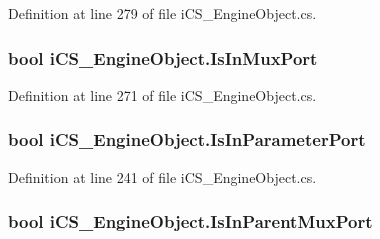 Definition at line 279 of file i\+C\+S\+\_\+\+Engine\+Object.\+cs.

\hypertarget{classi_c_s___engine_object_a36a536c2bf8972d1c82a1d183d91dc63}{
\subsubsection[{Is\+In\+Mux\+Port}]{\setlength{\rightskip}{0pt plus 5cm}bool i\+C\+S\+\_\+\+Engine\+Object.\+Is\+In\+Mux\+Port\hspace{0.3cm}{\ttfamily [get]}}}\label{classi_c_s___engine_object_a36a536c2bf8972d1c82a1d183d91dc63}


Definition at line 271 of file i\+C\+S\+\_\+\+Engine\+Object.\+cs.

\hypertarget{classi_c_s___engine_object_afb4b7b4a2c36e8b4621faeb4a4140310}{
\subsubsection[{Is\+In\+Parameter\+Port}]{\setlength{\rightskip}{0pt plus 5cm}bool i\+C\+S\+\_\+\+Engine\+Object.\+Is\+In\+Parameter\+Port\hspace{0.3cm}{\ttfamily [get]}}}\label{classi_c_s___engine_object_afb4b7b4a2c36e8b4621faeb4a4140310}


Definition at line 241 of file i\+C\+S\+\_\+\+Engine\+Object.\+cs.

\hypertarget{classi_c_s___engine_object_a2917f4e570c43ba79f94a93357164aa8}{
\subsubsection[{Is\+In\+Parent\+Mux\+Port}]{\setlength{\rightskip}{0pt plus 5cm}bool i\+C\+S\+\_\+\+Engine\+Object.\+Is\+In\+Parent\+Mux\+Port\hspace{0.3cm}{\ttfamily [get]}}}\label{classi_c_s___engine_object_a2917f4e570c43ba79f94a93357164aa8}


